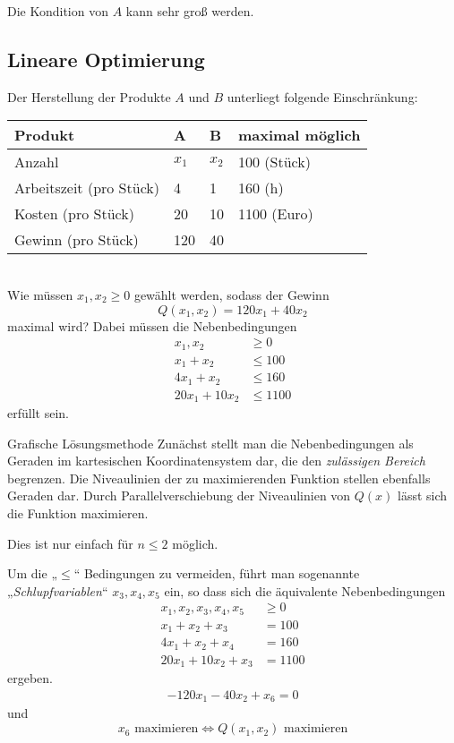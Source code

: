 \documentclass[a4paper]{scrartcl}
\numberwithin{equation}{section}
\begin{document}
\begin{note}
	Die Kondition von $A$ kann sehr groß werden.
\end{note}


\subsection{Lineare Optimierung}


\begin{ex}[Produktionsproblem]
	\label{ex:5.2}
	Der Herstellung der Produkte $A$ und $B$ unterliegt folgende Einschränkung: \\
	\begin{tabular}{l|l|l|l}
		Produkt & A & B & maximal möglich\\
		\hline
		Anzahl & $x_1$ & $x_2$ & 100 (Stück)\\
		Arbeitszeit (pro Stück) & 4 & 1 & 160 (h)\\
		Kosten (pro Stück) & 20 & 10 & 1100 (Euro)\\
		Gewinn (pro Stück) & 120 & 40 & 
	\end{tabular}\\
	Wie müssen $x_1,x_2\ge 0$ gewählt werden, sodass der Gewinn
	\[
		Q(x_1,x_2) = 120x_1 + 40x_2
	\]
	maximal wird?
	Dabei müssen die Nebenbedingungen
	\begin{align*}
		x_1,x_2 &\ge 0\\
		x_1 + x_2 &\le 100\\
		4x_1 + x_2 &\le 160\\
		20x_1 + 10x_2 &\le 1100
	\end{align*}
	erfüllt sein.

	\begin{seg}{Grafische Lösungsmethode}
		Zunächst stellt man die Nebenbedingungen als Geraden im kartesischen Koordinatensystem dar, die den \emph{zulässigen Bereich} begrenzen.
		Die Niveaulinien der zu maximierenden Funktion stellen ebenfalls Geraden dar.
		Durch Parallelverschiebung der Niveaulinien von $Q(x)$ lässt sich die Funktion maximieren.

		Dies ist nur einfach für $n\le2$ möglich.
	\end{seg}
	Um die „$\le$“ Bedingungen zu vermeiden, führt man sogenannte „\emph{Schlupfvariablen}“ $x_3,x_4,x_5$ ein, so dass sich die äquivalente Nebenbedingungen
	\begin{align*}
		x_1,x_2,x_3,x_4,x_5 &\ge 0\\
		x_1 + x_2 + x_3 &= 100\\
		4x_1 + x_2 + x_4 &= 160\\
		20x_1 + 10x_2 + x_3 &= 1100
	\end{align*}
	ergeben.
	\begin{align*}
		-120 x_1 - 40 x_2 + x_6 = 0
	\end{align*}
	und
	\[
		x_6 \text{ maximieren} \iff Q(x_1,x_2) \text{ maximieren}
	\]
\end{ex}
\end{document}
